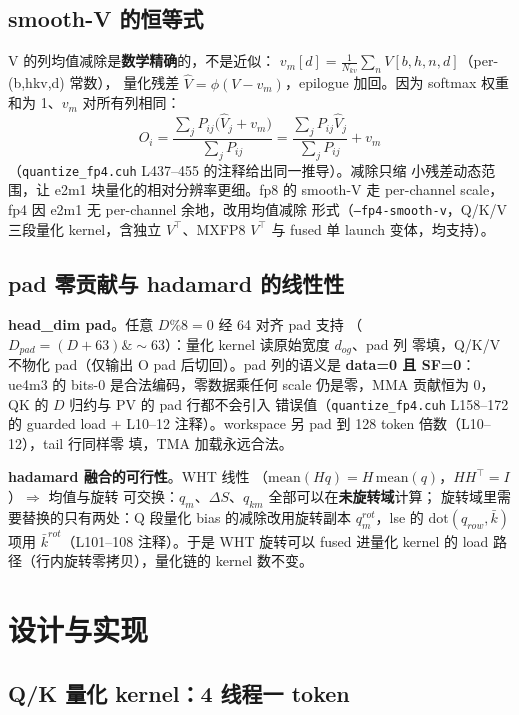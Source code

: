 \subsection{smooth-V 的恒等式}

V 的列均值减除是\textbf{数学精确}的，不是近似：
$v_m[d]=\frac{1}{N_{kv}}\sum_n V[b,h,n,d]$（per-(b,hkv,d) 常数），
量化残差 $\hat V=\phi(V-v_m)$，epilogue 加回。因为 softmax 权重和为
1、$v_m$ 对所有列相同：
\begin{equation}
  O_i=\frac{\sum_j P_{ij}\bigl(\hat V_j+v_m\bigr)}{\sum_j P_{ij}}
  =\frac{\sum_j P_{ij}\hat V_j}{\sum_j P_{ij}}+v_m
  \label{eq:31-smoothv}
\end{equation}
（\texttt{quantize\_fp4.cuh} L437--455 的注释给出同一推导）。减除只缩
小残差动态范围，让 e2m1 块量化的相对分辨率更细。fp8 的 smooth-V 走
per-channel scale，fp4 因 e2m1 无 per-channel 余地，改用均值减除
形式（\texttt{--fp4-smooth-v}，Q/K/V 三段量化 kernel，含独立
$V^\top$、MXFP8 $V^\top$ 与 fused 单 launch 变体，均支持）。

\subsection{pad 零贡献与 hadamard 的线性性}

\textbf{head\_dim pad}。任意 $D\%8=0$ 经 64 对齐 pad 支持
（$D_{pad}=(D+63)\&\sim63$）：量化 kernel 读原始宽度 $d_{og}$、pad 列
零填，Q/K/V 不物化 pad（仅输出 O pad 后切回）。pad 列的语义是
\textbf{data=0 且 SF=0}：ue4m3 的 bits-0 是合法编码，零数据乘任何
scale 仍是零，MMA 贡献恒为 0，QK 的 $D$ 归约与 PV 的 pad 行都不会引入
错误值（\texttt{quantize\_fp4.cuh} L158--172 的 guarded load + L10--12
注释）。workspace 另 pad 到 128 token 倍数（L10--12），tail 行同样零
填，TMA 加载永远合法。

\textbf{hadamard 融合的可行性}。WHT 线性
（$\mathrm{mean}(Hq)=H\,\mathrm{mean}(q)$，$HH^\top=I$）$\Rightarrow$ 均值与旋转
可交换：$q_m$、$\Delta S$、$q_{km}$ 全部可以在\textbf{未旋转域}计算；
旋转域里需要替换的只有两处：Q 段量化 bias 的减除改用旋转副本
$q_m^{rot}$，lse 的 $\mathrm{dot}(q_{row},\bar k)$ 项用 $\bar
k^{rot}$（L101--108 注释）。于是 WHT 旋转可以 fused 进量化 kernel
的 load 路径（行内旋转零拷贝），量化链的 kernel 数不变。

\section{设计与实现}

\subsection{Q/K 量化 kernel：4 线程一 token}

